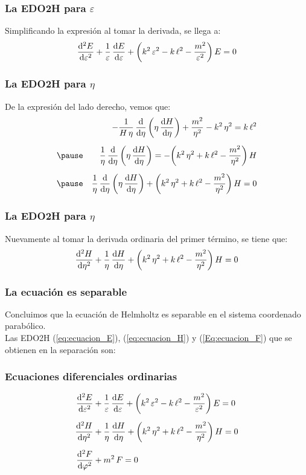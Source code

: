 \documentclass[12pt]{beamer}
\begin{document}
\begin{frame}
\frametitle{La EDO2H para $\varepsilon$}
Simplificando la expresión al tomar la derivada, se llega a:
\pause
\begin{align}
\dv[2]{E}{\varepsilon} + \dfrac{1}{\varepsilon} \, \dv{E}{\varepsilon} + \bigg( k^{2} \, \varepsilon^{2} - k \, \ell^{2} - \dfrac{m^{2}}{\varepsilon^{2}} \bigg) \, E = 0
\label{eq:ecuacion_E}
\end{align}
\end{frame}
\begin{frame}
\frametitle{La EDO2H para $\eta$}
De la expresión del lado derecho, vemos que:
\pause
\begin{eqnarray*}
&{}&- \dfrac{1}{H \, \eta} \, \dv{\eta} \left( \eta \, \dv{H}{\eta} \right) + \dfrac{m^{2}}{\eta^{2}} - k^{2} \, \eta^{2} = k \, \ell^{2} \\[0.5em] \pause
&{}&\dfrac{1}{\eta} \, \dv{\eta} \left( \eta \, \dv{H}{\eta} \right) = - \bigg( k^{2} \, \eta^{2} + k \, \ell^{2} - \dfrac{m^{2}}{\eta^{2}} \bigg) \, H \\[0.5em] \pause
&{}&\dfrac{1}{\eta} \, \dv{\eta} \left( \eta \, \dv{H}{\eta} \right) + \bigg( k^{2} \, \eta^{2} + k \, \ell^{2} - \dfrac{m^{2}}{\eta^{2}} \bigg) \, H = 0
\end{eqnarray*}
\end{frame}
\begin{frame}
\frametitle{La EDO2H para $\eta$}
Nuevamente al tomar la derivada ordinaria del primer término, se tiene que:
\begin{align}
\dv[2]{H}{\eta} + \dfrac{1}{\eta} \, \dv{H}{\eta} + \bigg( k^{2} \, \eta^{2} + k \, \ell^{2} - \dfrac{m^{2}}{\eta^{2}} \bigg) \, H = 0
\label{eq:ecuacion_H}
\end{align}
\end{frame}
\begin{frame}
\frametitle{La ecuación es separable}
Concluimos que la ecuación de Helmholtz es separable en el sistema coordenado parabólico.
\\
\bigskip
\pause
Las EDO2H (\ref{eq:ecuacion_E}), (\ref{eq:ecuacion_H}) y (\ref{Eq:ecuacion_F}) que se obtienen en la separación son:
\end{frame}
\begin{frame}
\frametitle{Ecuaciones diferenciales ordinarias}
\begin{align}
\begin{aligned}
\dv[2]{E}{\varepsilon} &+ \dfrac{1}{\varepsilon} \, \dv{E}{\varepsilon} + \bigg( k^{2} \, \varepsilon^{2} - k \, \ell^{2} - \dfrac{m^{2}}{\varepsilon^{2}} \bigg) \, E = 0 \\[0.5em]
\dv[2]{H}{\eta} &+ \dfrac{1}{\eta} \, \dv{H}{\eta} + \bigg( k^{2} \, \eta^{2} + k \, \ell^{2} - \dfrac{m^{2}}{\eta^{2}} \bigg) \, H = 0 \\[0.5em]
\dv[2]{F}{\varphi} &+ m^{2} \, F = 0
\end{aligned}
\label{eq:ecuacion_EHF}
\end{align}
\end{frame}
\end{document}
